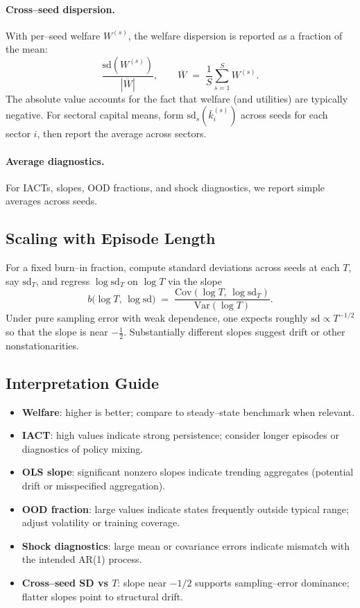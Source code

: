 \documentclass[12pt,english]{article}
\begin{document}
\paragraph{Cross--seed dispersion.} With per--seed welfare $W^{(s)}$, the welfare dispersion is reported as a fraction of the mean:
\[ \frac{\mathrm{sd}(W^{(s)})}{|\overline{W}|}, \qquad \overline{W} \;=\; \frac{1}{S}\sum_{s=1}^{S} W^{(s)}. \]
The absolute value accounts for the fact that welfare (and utilities) are typically negative. For sectoral capital means, form $\mathrm{sd}_s(\bar{k}_{i}^{(s)})$ across seeds for each sector $i$, then report the average across sectors.

\paragraph{Average diagnostics.} For IACTs, slopes, OOD fractions, and shock diagnostics, we report simple averages across seeds.

\subsection{Scaling with Episode Length}
For a fixed burn--in fraction, compute standard deviations across seeds at each $T$, say $\mathrm{sd}_T$, and regress $\log \mathrm{sd}_T$ on $\log T$ via the slope
\[ b\bigl(\log T,\, \log \mathrm{sd}\bigr) \;=\; \frac{\mathrm{Cov}(\log T,\, \log \mathrm{sd}_T)}{\mathrm{Var}(\log T)}. \]
Under pure sampling error with weak dependence, one expects roughly $\mathrm{sd}\propto T^{-1/2}$ so that the slope is near $-\tfrac{1}{2}$. Substantially different slopes suggest drift or other nonstationarities.

\subsection{Interpretation Guide}
\begin{itemize}
  \item \textbf{Welfare}: higher is better; compare to steady--state benchmark when relevant.
  \item \textbf{IACT}: high values indicate strong persistence; consider longer episodes or diagnostics of policy mixing.
  \item \textbf{OLS slope}: significant nonzero slopes indicate trending aggregates (potential drift or misspecified aggregation).
  \item \textbf{OOD fraction}: large values indicate states frequently outside typical range; adjust volatility or training coverage.
  \item \textbf{Shock diagnostics}: large mean or covariance errors indicate mismatch with the intended AR(1) process.
  \item \textbf{Cross--seed SD vs $T$}: slope near $-1/2$ supports sampling--error dominance; flatter slopes point to structural drift.
\end{itemize}
\end{document}
